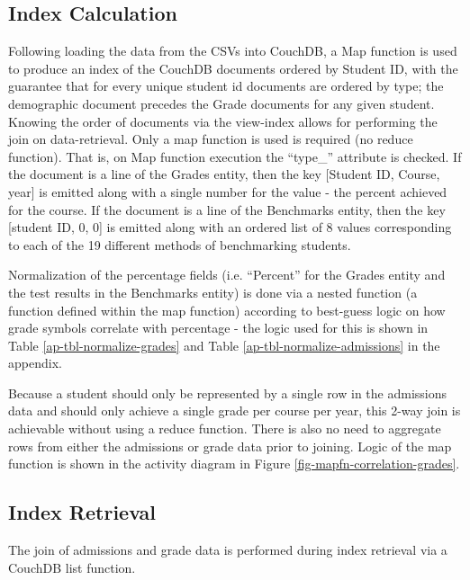 \subsection{Index Calculation}
Following loading the data from the CSVs into CouchDB, a Map function is used to produce an index of the CouchDB documents ordered by Student ID, with the guarantee that for every unique student id documents are ordered by type; the demographic document precedes the Grade documents for any given student. Knowing the order of documents via the view-index allows for performing the join on data-retrieval. Only a map function is used is required (no reduce function). That is, on Map function execution the ``type\_'' attribute is checked. If the document is a line of the Grades entity, then the key [Student ID, Course, year] is emitted along with a single number for the value - the percent achieved for the course. If the document is a line of the Benchmarks entity, then the key [student ID, 0, 0] is emitted along with an ordered list of 8 values corresponding to each of the 19 different methods of benchmarking students.

Normalization of the percentage fields (i.e. ``Percent'' for the Grades entity and the test results in the Benchmarks entity) is done via a nested function (a function defined within the map function) according to best-guess logic on how grade symbols correlate with percentage - the logic used for this is shown in Table \ref{ap-tbl-normalize-grades} and Table \ref{ap-tbl-normalize-admissions} in the appendix.

Because a student should only be represented by a single row in the admissions data and should only achieve a single grade per course per year, this 2-way join is achievable without using a reduce function. There is also no need to aggregate rows from either the admissions or grade data prior to joining. Logic of the map function is shown in the activity diagram in Figure \ref{fig-mapfn-correlation-grades}.



\subsection{Index Retrieval}
The join of admissions and grade data is performed during index retrieval via a CouchDB list function.

